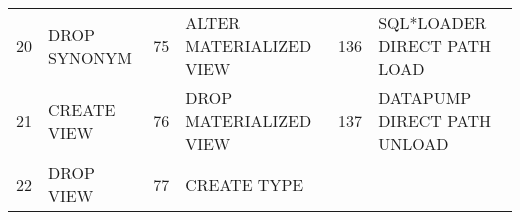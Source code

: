 \begin{longtable}[]{@{}llllll@{}}
\begin{minipage}[t]{0.06\columnwidth}
20\strut
\end{minipage} & \begin{minipage}[t]{0.19\columnwidth}\raggedright\strut
DROP SYNONYM\strut
\end{minipage} & \begin{minipage}[t]{0.06\columnwidth}\raggedright\strut
75\strut
\end{minipage} & \begin{minipage}[t]{0.24\columnwidth}\raggedright\strut
ALTER MATERIALIZED VIEW\strut
\end{minipage} & \begin{minipage}[t]{0.06\columnwidth}\raggedright\strut
136\strut
\end{minipage} & \begin{minipage}[t]{0.24\columnwidth}\raggedright\strut
SQL*LOADER DIRECT PATH LOAD\strut
\end{minipage}\tabularnewline
\begin{minipage}[t]{0.06\columnwidth}\raggedright\strut
21\strut
\end{minipage} & \begin{minipage}[t]{0.19\columnwidth}\raggedright\strut
CREATE VIEW\strut
\end{minipage} & \begin{minipage}[t]{0.06\columnwidth}\raggedright\strut
76\strut
\end{minipage} & \begin{minipage}[t]{0.24\columnwidth}\raggedright\strut
DROP MATERIALIZED VIEW\strut
\end{minipage} & \begin{minipage}[t]{0.06\columnwidth}\raggedright\strut
137\strut
\end{minipage} & \begin{minipage}[t]{0.24\columnwidth}\raggedright\strut
DATAPUMP DIRECT PATH UNLOAD\strut
\end{minipage}\tabularnewline
\begin{minipage}[t]{0.06\columnwidth}\raggedright\strut
22\strut
\end{minipage} & \begin{minipage}[t]{0.19\columnwidth}\raggedright\strut
DROP VIEW\strut
\end{minipage} & \begin{minipage}[t]{0.06\columnwidth}\raggedright\strut
77\strut
\end{minipage} & \begin{minipage}[t]{0.24\columnwidth}\raggedright\strut
CREATE TYPE\strut
\end{minipage} & \begin{minipage}[t]{0.06\columnwidth}\raggedright\strut

\end{minipage}
\end{longtable}
